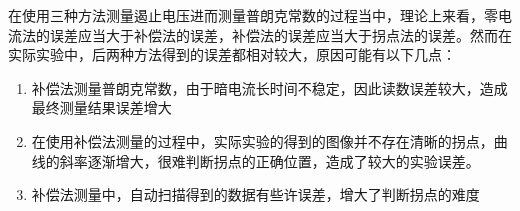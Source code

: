 \documentclass[10pt,a4paper]{article}	%
\begin{document}
	在使用三种方法测量遏止电压进而测量普朗克常数的过程当中，理论上来看，零电流法的误差应当大于补偿法的误差，补偿法的误差应当大于拐点法的误差。然而在实际实验中，后两种方法得到的误差都相对较大，原因可能有以下几点：
	\begin{enumerate}
		\item 补偿法测量普朗克常数，由于暗电流长时间不稳定，因此读数误差较大，造成最终测量结果误差增大
		\item 在使用补偿法测量的过程中，实际实验的得到的图像并不存在清晰的拐点，曲线的斜率逐渐增大，很难判断拐点的正确位置，造成了较大的实验误差。
		\item 补偿法测量中，自动扫描得到的数据有些许误差，增大了判断拐点的难度
	\end{enumerate}

\end{document}
